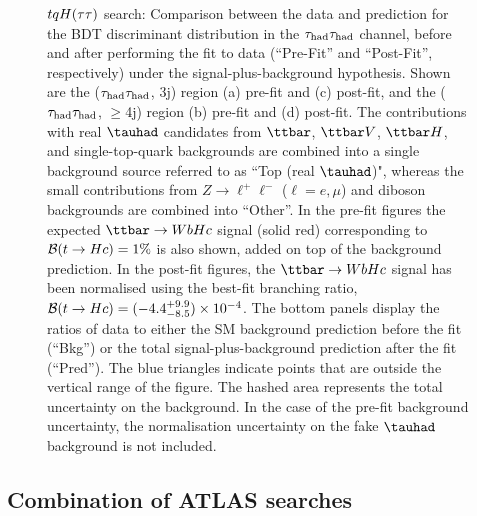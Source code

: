 \begin{figure}[htbp]
\begin{center}
\caption{\small{$tqH(\tau\tau)$ search: Comparison between the data and prediction for the BDT discriminant distribution in the 
$\tau_{\mathrm{had}} \tau_{\mathrm{had}}$ channel, before and after performing the fit to data  (``Pre-Fit'' and ``Post-Fit'', respectively) under the signal-plus-background hypothesis.
Shown are the ($\tau_{\mathrm{had}} \tau_{\mathrm{had}}$, 3j) region (a) pre-fit and (c) post-fit, and the ($\tau_{\mathrm{had}} \tau_{\mathrm{had}}$, $\geq$4j) region (b) pre-fit and (d) post-fit.
The contributions with real $\tauhad$ candidates from $\ttbar$,  $\ttbar V$, $\ttbar H$, and single-top-quark backgrounds are combined into
a single background source referred to as ``Top (real $\tauhad$)", whereas the small contributions from 
$Z\to \ell^+\ell^-$ ($\ell = e, \mu$) and diboson backgrounds are combined into ``Other''. 
In the pre-fit figures the expected $\Hc$ signal (solid red) corresponding to $\mathcal{B}(t\to Hc)=1\%$ is also shown,
added on top of the background prediction. In the post-fit figures, the $\Hc$ signal has been normalised using the best-fit branching ratio, 
$\mathcal{B}(t\to Hc)=(-4.4^{+9.9}_{-8.5})\times 10^{-4}$.
The bottom panels display the ratios of data to either the SM background prediction before the fit (``Bkg'')  or the total signal-plus-background
prediction after the fit (``Pred''). 
The blue triangles indicate points that are outside the vertical range of the figure. 
The hashed area represents the total uncertainty on the background. 
In the case of the pre-fit background uncertainty, the normalisation uncertainty on the fake $\tauhad$ background is not included.}}
\label{fig:prepostfit_unblinded_WbHc_hh}
\end{center}
\end{figure}

\subsection{Combination of ATLAS searches}
\label{sec:results_combo}

